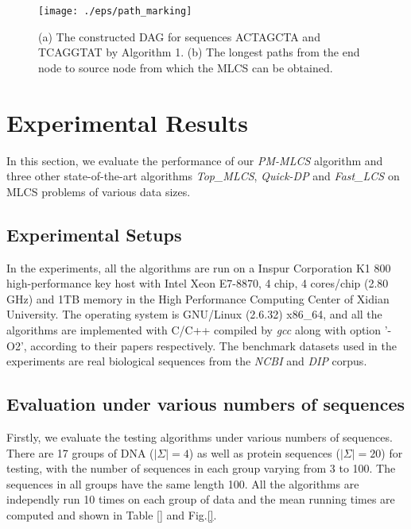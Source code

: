 \documentclass{article}
\begin{document}
\begin{figure}[htbp]
  \centering
  \texttt{[image: ./eps/path\_marking]}
  \caption{(a) The constructed DAG for sequences ACTAGCTA and TCAGGTAT
    by Algorithm 1. (b) The longest paths from the end node to source
    node from which the MLCS can be obtained.}
  \label{fig:path_marking}
\end{figure}


\section{Experimental Results}
\label{sec:experiments}

In this section, we evaluate the performance of our \emph{PM-MLCS}
algorithm and three other state-of-the-art algorithms
\emph{Top\_MLCS}\cite{LiICDE}, \emph{Quick-DP} \cite{Wang2011} and
\emph{Fast\_LCS} \cite{Chen2006} on MLCS problems of various data
sizes.

\subsection{Experimental Setups}
\label{sec:setup}

In the experiments, all the algorithms are run on a Inspur Corporation
K1 800 high-performance key host with Intel Xeon E7-8870, 4 chip, 4
cores/chip (2.80 GHz) and 1TB memory in the High Performance Computing
Center of Xidian University. The operating system is GNU/Linux
(2.6.32) x86\_64, and all the algorithms are implemented with C/C++
compiled by \emph{gcc} along with option '-O2', according to their
papers respectively. The benchmark datasets used in the experiments
are real biological sequences from the \emph{NCBI} \cite{} and
\emph{DIP} \cite{} corpus.

\subsection{Evaluation under various numbers of sequences}
\label{sec:number}

Firstly, we evaluate the testing algorithms under various numbers of
sequences. There are 17 groups of DNA ($|\Sigma|=4$) as well as
protein sequences ($|\Sigma|=20$) for testing, with the number of
sequences in each group varying from 3 to 100. The sequences in all
groups have the same length 100. All the algorithms are independly run
10 times on each group of data and the mean running times are computed
and shown in Table \ref{} and Fig.\ref{}.
\end{document}
